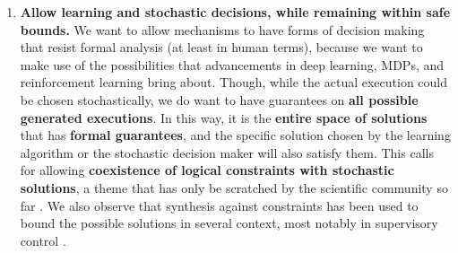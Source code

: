 \begin{enumerate}
\item 
\textbf{Allow learning and stochastic decisions, while remaining within safe bounds.}
We want to allow mechanisms to have forms of decision making that
resist formal analysis (at least in human terms), because we want to
make use of the possibilities that advancements in deep learning,
MDPs, and reinforcement learning bring about. Though, while the actual
execution could be chosen stochastically, we do want to have
guarantees on \textbf{all possible generated executions}.  In this
way, it is the \textbf{entire space of solutions} that has
\textbf{formal guarantees}, and the specific solution chosen by the
learning algorithm or the stochastic decision maker will also satisfy
them. %
  This calls for allowing \textbf{coexistence of logical constraints
    with stochastic solutions}, a theme that has only be scratched by
  the scientific community so far \cite{BeckL12,SprauelKT14,BDMS17}.
  We also observe that synthesis against constraints has been used to bound the
  possible solutions in several context, most notably in supervisory
  control \cite{Wo14,BanihashemiGL16}.





\end{enumerate}






